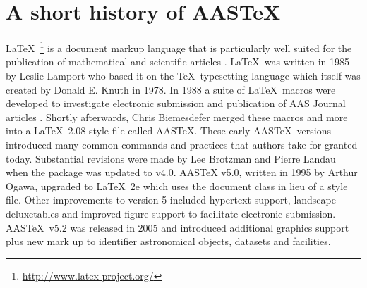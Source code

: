 \documentclass[linenumbers,amsmath,trackchanges]{aastex702}
\newcommand\aastex{AAS\TeX}
\newcommand\latex{La\TeX}
\begin{document}


\section{A short history of AASTeX} 

\latex\ \footnote{\url{http://www.latex-project.org/}} is a document markup
language that is particularly well suited for the publication of
mathematical and scientific articles \citep{lamport94}. \latex\ was written
in 1985 by Leslie Lamport who based it on the \TeX\ typesetting language
which itself was created by Donald E. Knuth in 1978.  In 1988 a suite of
\latex\ macros were developed to investigate electronic submission and
publication of AAS Journal articles \citep{1989BAAS...21..780H}.  Shortly
afterwards, Chris Biemesdefer merged these macros and more into a \latex\
2.08 style file called \aastex.  These early \aastex\ versions introduced
many common commands and practices that authors take for granted today.
Substantial revisions
were made by Lee Brotzman and Pierre Landau when the package was updated to
v4.0.  AASTeX v5.0, written in 1995 by Arthur Ogawa, upgraded to \latex\ 2e
which uses the document class in lieu of a style file.  Other improvements
to version 5 included hypertext support, landscape deluxetables and
improved figure support to facilitate electronic submission.  
\aastex\ v5.2 was released in 2005 and introduced additional graphics
support plus new mark up to identifier astronomical objects, datasets and
facilities.
\end{document}
